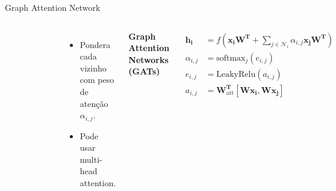 \documentclass{beamer}
\begin{document}
\begin{frame}{Graph Attention Network \cite{velickovic2018gats}}

	\begin{columns}[t]
		\vspace{-5mm}
    \begin{figure}[h]
      \centering
      \includegraphics[width=0.5\textwidth]{assets/Grafo.png}
    \end{figure}
    \small
    \begin{itemize}
      \item Pondera cada vizinho com peso de atenção $\alpha_{i,j}$.
      \item Pode usar multi-head attention.
    \end{itemize}

		\vspace{-5mm}
    \begin{center}
      \textbf{Graph Attention Networks (GATs)}
    \end{center}
    \[
      \begin{aligned}
        \bm{h_i} & = f\left(\bm{x_i W^T} + \sum_{j \in \mathcal{N}_i} \alpha_{i,j} \bm{x_j W^T} \right) \\
        \alpha_{i,j} & = \mathrm{softmax}_j(e_{i,j}) \\
        e_{i,j} & = \mathrm{LeakyRelu}(a_{i,j}) \\
        a_{i,j} & = \bm{W_{\mathrm{att}}^T}[\bm{W x_i}, \bm{W x_j}]
      \end{aligned}
    \]
  \end{columns}

\end{frame}
\end{document}
